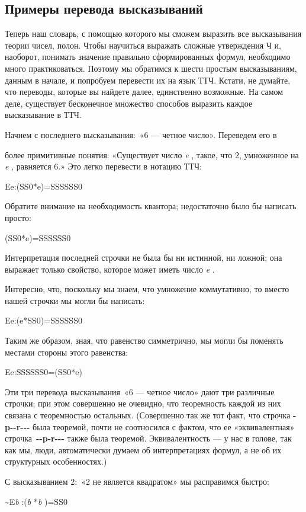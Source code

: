 \documentclass[../main.tex]{subfiles}
\begin{document}
\subsection{Примеры перевода высказываний}

Теперь наш словарь, с помощью которого мы сможем выразить все высказывания теории чисел, полон. Чтобы научиться выражать сложные утверждения Ч и, наоборот, понимать значение правильно сформированных формул, необходимо много практиковаться. Поэтому мы обратимся к шести простым высказываниям, данным в начале, и попробуем перевести их на язык ТТЧ. Кстати, не думайте, что переводы, которые вы найдете далее, единственно возможные. На самом деле, существует бесконечное множество способов выразить каждое высказывание в ТТЧ.

Начнем с последнего высказывания:~«6 --- четное число». Переведем его в

более примитивные понятия: «Существует число \emph{e} , такое, что 2, умноженное на \emph{e} , равняется 6.» Это легко перевести в нотацию ТТЧ:

Ee:(SS0*e)=SSSSSS0

Обратите внимание на необходимость квантора; недостаточно было бы написать просто:

(SS0*e)=SSSSSS0

Интерпретация последней строчки не была бы ни истинной, ни ложной; она выражает только свойство, которое может иметь число \emph{e} .

Интересно, что, поскольку мы знаем, что умножение коммутативно, то вместо нашей строчки мы могли бы написать:

Ee:(e*SS0)=SSSSSS0

Таким же образом, зная, что равенство симметрично, мы могли бы поменять местами стороны этого равенства:

Ee:SSSSSS0=(SS0*e)

Эти три перевода высказывания~«6 --- четное число» дают три различные строчки; при этом совершенно не очевидно, что теоремность каждой из них связана с теоремностью остальных. (Совершенно так же тот факт, что строчка \textbf{-p-\/-r-\/-\/-} была теоремой, почти не соотносился с фактом, что ее «эквивалентная» строчка~\textbf{-\/-p-r-\/-\/-} также была теоремой. Эквивалентность --- у нас в голове, так как мы, люди, автоматически думаем об интерпретациях формул, а не об их структурных особенностях.)

С высказыванием 2:~«2 не является квадратом» мы расправимся быстро:

\textasciitilde E\emph{b} :(\emph{b} *\emph{b} )=SS0
\end{document}
